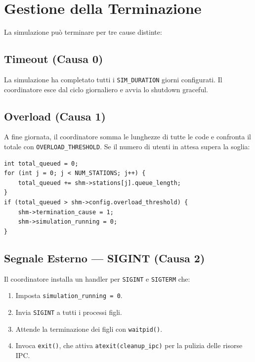 \documentclass[a4paper,12pt]{article}
\begin{document}
\section{Gestione della Terminazione}

La simulazione può terminare per tre cause distinte:

\subsection{Timeout (Causa 0)}

La simulazione ha completato tutti i \texttt{SIM\_DURATION} giorni
configurati. Il coordinatore esce dal ciclo giornaliero e avvia
lo shutdown graceful.

\subsection{Overload (Causa 1)}

A fine giornata, il coordinatore somma le lunghezze di tutte le
code e confronta il totale con \texttt{OVERLOAD\_THRESHOLD}. Se
il numero di utenti in attesa supera la soglia:

\begin{lstlisting}
int total_queued = 0;
for (int j = 0; j < NUM_STATIONS; j++) {
    total_queued += shm->stations[j].queue_length;
}
if (total_queued > shm->config.overload_threshold) {
    shm->termination_cause = 1;
    shm->simulation_running = 0;
}
\end{lstlisting}

\subsection{Segnale Esterno --- SIGINT (Causa 2)}

Il coordinatore installa un handler per \texttt{SIGINT} e
\texttt{SIGTERM} che:
\begin{enumerate}
  \item Imposta \texttt{simulation\_running = 0}.
  \item Invia \texttt{SIGINT} a tutti i processi figli.
  \item Attende la terminazione dei figli con \texttt{waitpid()}.
  \item Invoca \texttt{exit()}, che attiva \texttt{atexit(cleanup\_ipc)}
        per la pulizia delle risorse IPC.
\end{enumerate}
\end{document}
